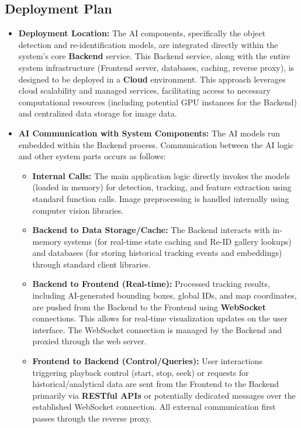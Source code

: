 \subsection{Deployment Plan}
\label{subsection:deployment_plan} %
\begin{itemize}
    \item \textbf{Deployment Location:}
        The AI components, specifically the object detection and re-identification models, are integrated directly within the system's core \textbf{Backend} service. This Backend service, along with the entire system infrastructure (Frontend server, databases, caching, reverse proxy), is designed to be deployed in a \textbf{Cloud} environment. This approach leverages cloud scalability and managed services, facilitating access to necessary computational resources (including potential GPU instances for the Backend) and centralized data storage for image data.
    \item \textbf{AI Communication with System Components:}
        The AI models run embedded within the Backend process. Communication between the AI logic and other system parts occurs as follows:
        \begin{itemize}
            \item \textbf{Internal Calls:} The main application logic directly invokes the models (loaded in memory) for detection, tracking, and feature extraction using standard function calls. Image preprocessing is handled internally using computer vision libraries.
            \item \textbf{Backend to Data Storage/Cache:} The Backend interacts with in-memory systems (for real-time state caching and Re-ID gallery lookups) and databases (for storing historical tracking events and embeddings) through standard client libraries.
            \item \textbf{Backend to Frontend (Real-time):} Processed tracking results, including AI-generated bounding boxes, global IDs, and map coordinates, are pushed from the Backend to the Frontend using \textbf{WebSocket} connections. This allows for real-time visualization updates on the user interface. The WebSocket connection is managed by the Backend and proxied through the web server.
            \item \textbf{Frontend to Backend (Control/Queries):} User interactions triggering playback control (start, stop, seek) or requests for historical/analytical data are sent from the Frontend to the Backend primarily via \textbf{RESTful APIs} or potentially dedicated messages over the established WebSocket connection. All external communication first passes through the reverse proxy.
        \end{itemize}


\end{itemize}
